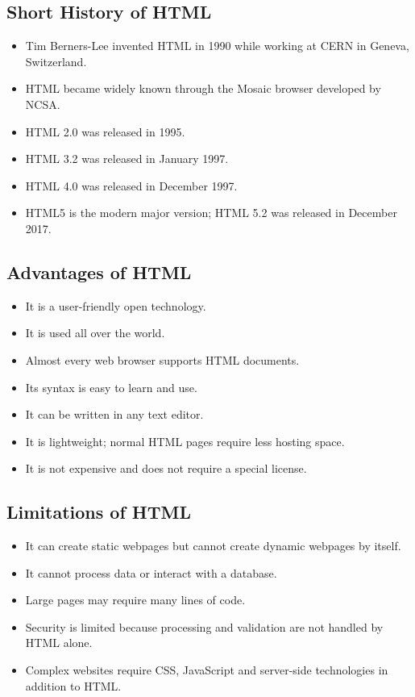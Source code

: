 \subsection{Short History of HTML}
\begin{itemize}
    \item Tim Berners-Lee invented HTML in 1990 while working at CERN in Geneva, Switzerland.
    \item HTML became widely known through the Mosaic browser developed by NCSA.
    \item HTML 2.0 was released in 1995.
    \item HTML 3.2 was released in January 1997.
    \item HTML 4.0 was released in December 1997.
    \item HTML5 is the modern major version; HTML 5.2 was released in December 2017.
\end{itemize}

\subsection{Advantages of HTML}
\begin{itemize}
    \item It is a user-friendly open technology.
    \item It is used all over the world.
    \item Almost every web browser supports HTML documents.
    \item Its syntax is easy to learn and use.
    \item It can be written in any text editor.
    \item It is lightweight; normal HTML pages require less hosting space.
    \item It is not expensive and does not require a special license.
\end{itemize}

\subsection{Limitations of HTML}
\begin{itemize}
    \item It can create static webpages but cannot create dynamic webpages by itself.
    \item It cannot process data or interact with a database.
    \item Large pages may require many lines of code.
    \item Security is limited because processing and validation are not handled by HTML alone.
    \item Complex websites require CSS, JavaScript and server-side technologies in addition to HTML.
\end{itemize}

